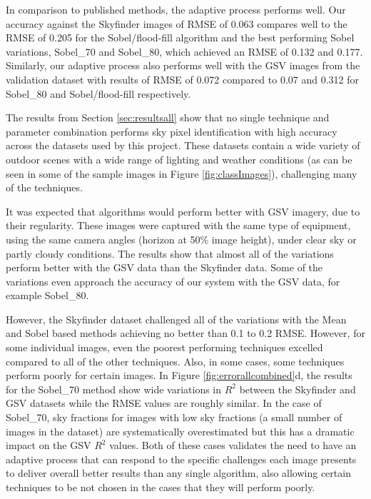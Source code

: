 \documentclass[final,3p,times,authoryear]{elsarticle}
\begin{document}
In comparison to published methods, the adaptive process performs well. Our accuracy against the Skyfinder images of RMSE of 0.063 compares well to the RMSE of 0.205 for the \cite{Middel2018} Sobel/flood-fill algorithm and the best performing \cite{Wang2015a} Sobel variations, Sobel\_70 and Sobel\_80, which achieved an RMSE of 0.132 and 0.177. Similarly, our adaptive process also performs well with the GSV images from the validation dataset with results of RMSE of 0.072 compared to 0.07 and 0.312 for Sobel\_80 and Sobel/flood-fill respectively.

The results from Section \ref{sec:resultsall} show that no single technique and parameter combination performs sky pixel identification with high accuracy across the datasets used by this project. These datasets contain a wide variety of outdoor scenes with a wide range of lighting and weather conditions (as can be seen in some of the sample images in Figure \ref{fig:classImages}), challenging many of the techniques. 

It was expected that algorithms would perform better with GSV imagery, due to their regularity. These images were captured with the same type of equipment, using the same camera angles (horizon at 50\% image height), under clear sky or partly cloudy conditions. The results show that almost all of the variations perform better with the GSV data than the Skyfinder data. Some of the variations even approach the accuracy of our system with the GSV data, for example Sobel\_80. 

However, the Skyfinder dataset challenged all of the variations with the Mean and Sobel based methods achieving no better than 0.1 to 0.2 RMSE. However, for some individual images, even the poorest performing techniques excelled compared to all of the other techniques. Also, in some cases, some techniques perform poorly for certain images. In Figure \ref{fig:errorallcombined}d, the results for the Sobel\_70 method show wide variations in $R^{2}$ between the Skyfinder and GSV datasets while the RMSE values are roughly similar. In the case of Sobel\_70, sky fractions for images with low sky fractions (a small number of images in the dataset) are systematically overestimated but this has a dramatic impact on the GSV $R^{2}$ values. Both of these cases validates the need to have an adaptive process that can respond to the specific challenges each image presents to deliver overall better results than any single algorithm, also allowing certain techniques to be not chosen in the cases that they will perform poorly.
\end{document}
